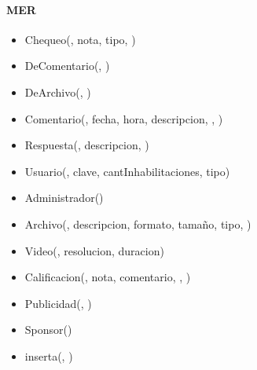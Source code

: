 \begin{multicols}{2}
	\paragraph{MER}
	\begin{itemize}
		\item[] Chequeo(, nota, tipo, )
		\item[] DeComentario(, )
		\item[] DeArchivo(, )
		\item[] Comentario(, fecha, hora, descripcion, , )
		\item[] Respuesta(, descripcion, )
		\item[] Usuario(, clave, cantInhabilitaciones, tipo)
		\item[] Administrador()
		\item[] Archivo(, descripcion, formato, tamaño, tipo, )
		\item[] Video(, resolucion, duracion)
		\item[] Calificacion(, nota, comentario, , )
		\item[] Publicidad(, )
		\item[] Sponsor()
		\item[] inserta(, )		
	\end{itemize}

	\columnbreak

\end{multicols}
